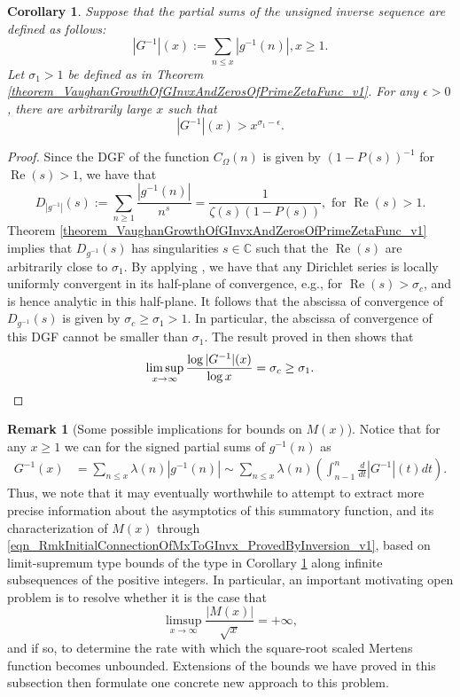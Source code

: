 \documentclass[11pt,reqno,a4letter]{article}
\numberwithin{figure}{section}
\numberwithin{table}{section}
\theoremstyle{plain}
\newtheorem{cor}[theorem]{Corollary}
\numberwithin{theorem}{section}
\theoremstyle{definition}
\newtheorem{remark}[theorem]{Remark}
\renewcommand{\Re}{\operatorname{Re}}
\begin{document}
\begin{cor}
\label{cor_Vaughan_LimSupLowerBounds_On_GInvx_AtLarge_x_v2} 
Suppose that the partial sums of the unsigned inverse sequence are defined as follows: 
\[
|G^{-1}|(x) := \sum_{n \leq x} |g^{-1}(n)|, x \geq 1. 
\]
Let $\sigma_1 > 1$ be defined as in 
Theorem \ref{theorem_VaughanGrowthOfGInvxAndZerosOfPrimeZetaFunc_v1}. 
For any $\epsilon > 0$, there are arbitrarily large $x$ such that 
\[
|G^{-1}|(x) > x^{\sigma_1-\epsilon}. 
\]
\end{cor}
\begin{proof} 
Since the DGF of the function $C_{\Omega}(n)$ is given by $(1-P(s))^{-1}$ for $\Re(s) > 1$,  
we have that 
\[
D_{|g^{-1}|}(s) := \sum_{n \geq 1} \frac{|g^{-1}(n)|}{n^s} = \frac{1}{\zeta(s)(1-P(s))}, 
     \text{ for } \Re(s) > 1. 
\]
Theorem \ref{theorem_VaughanGrowthOfGInvxAndZerosOfPrimeZetaFunc_v1} implies that 
$D_{g^{-1}}(s)$ has singularities $s \in \mathbb{C}$ such that 
the $\Re(s)$ are arbitrarily close to $\sigma_1$. 
By applying \cite[Cor.~1.2; \S 1.2]{MV}, we have that any Dirichlet series 
is locally uniformly convergent in its half-plane of convergence, 
e.g., for $\Re(s) > \sigma_c$, and is hence analytic in this half-plane. 
It follows that the abscissa of convergence of 
$D_{g^{-1}}(s)$ is given by $\sigma_c \geq \sigma_1 > 1$. In particular, 
the abscissa of convergence of this DGF cannot be smaller than $\sigma_1$. 
The result proved in \cite[Thm.~1.3; \S 1.2]{MV} then shows that 
\[
\limsup_{x \rightarrow \infty} \frac{\log |G^{-1}|(x)}{\log x} = \sigma_c \geq \sigma_1. 
     \qedhere 
\]
\end{proof}

\begin{remark}[Some possible implications for bounds on $M(x)$]
\label{remark_AbsGInvx_ProspectsOfTheNewBVBoundProofs_v2} 
Notice that for any $x \geq 1$ we can for the signed partial sums of $g^{-1}(n)$ as  
\begin{align*} 
G^{-1}(x) & = \sum_{n \leq x} \lambda(n) |g^{-1}(n)| \sim \sum_{n \leq x} \lambda(n) \left( 
     \int_{n-1}^{n} \frac{d}{dt} |G^{-1}|(t) dt \right). 
\end{align*} 
Thus, we note that it may eventually worthwhile to attempt to extract more precise information about the 
asymptotics of this summatory function, and its characterization of $M(x)$ through 
\eqref{eqn_RmkInitialConnectionOfMxToGInvx_ProvedByInversion_v1}, 
based on limit-supremum type bounds of the type in 
Corollary \ref{cor_Vaughan_LimSupLowerBounds_On_GInvx_AtLarge_x_v2} along infinite 
subsequences of the positive integers. 
In particular, an important motivating open problem is to resolve whether it is the case that
\[
\limsup_{x \rightarrow \infty} \frac{|M(x)|}{\sqrt{x}} = +\infty, 
\]
and if so, to determine the rate with which the square-root scaled Mertens function becomes unbounded.  
Extensions of the bounds we have proved in this subsection then formulate 
one concrete new approach to this problem. 
\end{remark}
\end{document}
